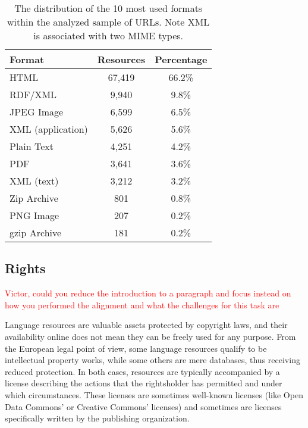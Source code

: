 \documentclass[11pt]{article}
\begin{document}
\begin{table}
    \begin{center}
	\begin{tabular}{l|cc}
            Format   & Resources  & Percentage\\
		
		\hline                                              
                HTML                &	67,419 & 66.2\%\\
                RDF/XML             &	9,940  & 9.8\% \\
                JPEG Image          &   6,599  & 6.5\% \\
                XML (application)   &	5,626  & 5.6\% \\
                Plain Text          & 4,251    & 4.2\% \\
                PDF                 &	3,641  & 3.6\% \\
                XML (text)          & 3,212    & 3.2\% \\
                Zip Archive         &	801    & 0.8\% \\
                PNG Image           & 207      & 0.2\% \\
                gzip Archive        & 181      & 0.2\% \\
	\end{tabular}
    \end{center}
	\caption{\label{tab:formats}The distribution of the 10 most used formats within the
        analyzed sample of URLs. Note XML is associated with two MIME types.}
\end{table}

\subsection{Rights}

\textcolor{red}{Victor, could you reduce the introduction to a paragraph and
    focus instead on how you performed the alignment and what the challenges
for this task are}

Language resources are valuable assets protected by copyright laws, and their availability online does not mean they can be freely used for any purpose. From the European legal point of view, some language resources qualify to be intellectual property works, while some others are mere databases, thus receiving reduced protection. In both cases, resources are typically accompanied by a license describing the actions that the rightsholder has permitted and under which circumstances. These licenses are sometimes well-known licenses (like Open Data Commons' or Creative Commons' licenses) and sometimes are licenses specifically written by the publishing organization. 
\end{document}
